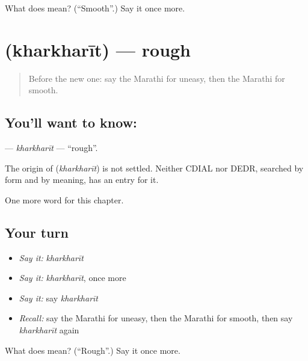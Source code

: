 \begin{tcolorbox}[breakable,colback=teal!4,colframe=teal!35!black,title={Before you move on}]
What does  mean? (\textquotedblleft{}Smooth\textquotedblright{}.) Say it once more.
\end{tcolorbox}
\section[\texorpdfstring{\mr{खरखरीत} (kharkharīt)}{खरखरीत (kharkharīt)}]{ (kharkharīt) — rough}

\label{lesson:MR-C232-kharkharit}



\begin{quote}
Before the new one: say the Marathi for uneasy, then the Marathi for smooth.
\end{quote}

\subsection*{You'll want to know: }
\textbf{} — \emph{kharkharīt} — \textquotedblleft{}rough\textquotedblright{}.

\begin{cousinweb}
The origin of \textbf{} (\emph{kharkharīt}) is not settled. Neither CDIAL nor DEDR, searched by form and by meaning, has an entry for it.
\end{cousinweb}

\begin{grammarlens}[title={What you've built}]
One more word for this chapter.
\end{grammarlens}

\subsection*{Your turn}
\begin{itemize}
\raggedright
  \item \emph{Say it:} \emph{kharkharīt}
  \item \emph{Say it:} \emph{kharkharīt}, once more
  \item \emph{Say it:} say \emph{kharkharīt}
  \item \emph{Recall:} say the Marathi for uneasy, then the Marathi for smooth, then say \emph{kharkharīt} again
\end{itemize}

\begin{tcolorbox}[breakable,colback=teal!4,colframe=teal!35!black,title={Before you move on}]
What does  mean? (\textquotedblleft{}Rough\textquotedblright{}.) Say it once more.
\end{tcolorbox}
